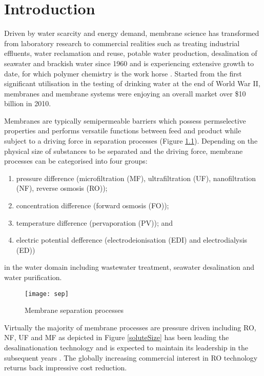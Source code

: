 \documentclass[a4paper,12pt]{report}
\begin{document}

\chapter{Introduction}

Driven by water scarcity and energy demand, membrane science has transformed from laboratory research to commercial realities such as treating industrial effluents, water reclamation and reuse, potable water production, desalination of seawater and brackish water since 1960 and is experiencing extensive growth to date, for which polymer chemistry is the work horse \citep{sin15}. Started from the first significant utilisation in the testing of drinking water at the end of World War II, membranes and membrane systems were enjoying an overall market over \$10 billion in 2010.

Membranes are typically semipermeable barriers which possess permselective properties and performs versatile functions between feed and product while subject to a driving force in separation processes (Figure \ref{sep}). Depending on the physical size of substances to be separated and the driving force, membrane processes can be categorised into four groups:
\begin{enumerate}
\item pressure difference (microfiltration (MF), ultrafiltration (UF), nanofiltration (NF), reverse osmosis (RO));
\item concentration difference (forward osmosis (FO));
\item temperature difference (pervaporation (PV)); and 
\item electric potential defference (electrodeionisation (EDI) and electrodialysis (ED)) 
\end{enumerate}
in the water domain including wastewater treatment, seawater desalination and water purification.

\begin{figure}[h!]
\centering
  \texttt{[image: sep]}
  \caption{Membrane separation processes}
  \label{sep}
\end{figure}

Virtually the majority of membrane processes are pressure driven including RO, NF, UF and MF as depicted in Figure \ref{soluteSize} has been leading the desalinationation technology and is expected to maintain its leadership in the subsequent years \citep{lee11}. The globally increasing commercial interest in RO technology returns back impressive cost reduction. 
\end{document}
